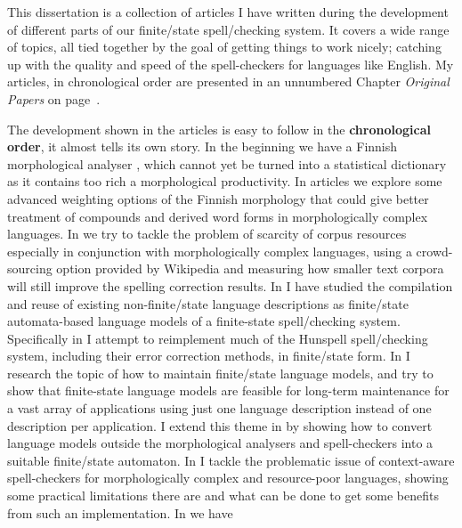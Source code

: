 \documentclass[officiallayout]{unihelcompling}
\begin{document}
This dissertation is a collection of articles I have written during the
development of different parts of our finite\-/state spell\-/checking system. It
covers a wide range of topics, all tied together by the goal of getting things
to work nicely; catching up with the quality and speed of the spell-checkers
for languages like English. My articles, in chronological order are presented
in an unnumbered Chapter \emph{Original Papers} on page~\pageref{chap:papers}.

The development shown in the articles is easy to follow in the
\textbf{chronological order}, it almost tells its own story. In the beginning
we have a Finnish morphological analyser \citep{pirinen2008suomen}, which
cannot yet be turned into a statistical dictionary as it contains too rich a
morphological productivity. In articles
 we explore some advanced
weighting options of the Finnish morphology that could give better treatment of
compounds and derived word forms in morphologically complex languages. In
 we try to tackle the problem of scarcity of
corpus resources especially in conjunction with morphologically complex
languages, using a crowd-sourcing option provided by Wikipedia and measuring
how smaller text corpora will still improve the spelling correction results. In
 I have studied the
compilation and reuse of existing non-finite\-/state language descriptions as
finite\-/state automata-based language models of a finite-state spell\-/checking
system.  Specifically in  I attempt to
reimplement much of the Hunspell spell\-/checking system, including their error
correction methods, in finite\-/state form. In
 I research the topic of how to maintain
finite\-/state language models, and try to show that finite-state language models
are feasible for long-term maintenance for a vast array of applications using
just one language description instead of one description per application.  I
extend this theme in  by showing how to
convert language models outside the morphological analysers and spell-checkers
into a suitable finite\-/state automaton. In  I
tackle the problematic issue of context-aware spell-checkers for
morphologically complex and resource-poor languages, showing some practical
limitations there are and what can be done to get some benefits from such an
implementation. In  we have
\end{document}

